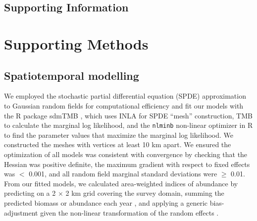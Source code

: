 \documentclass[12pt]{article}
\begin{document}

\renewcommand{\thefigure}{S\arabic{figure}}
\renewcommand{\thetable}{S\arabic{table}}
\setcounter{figure}{0}
\setcounter{table}{0}
\setcounter{section}{0}
\setcounter{subsection}{0}
\setcounter{subsubsection}{0}

\clearpage

\appendix


\setcounter{secnumdepth}{0} %

\onehalfspacing
\linenumbers
\resetlinenumber
\setcounter{page}{1}
\setcounter{equation}{0}
\nolinenumbers

\begin{Center}
\section*{Supporting Information}
\end{Center}

\section*{Supporting Methods}

\subsection*{Spatiotemporal modelling}

We employed the stochastic partial differential equation (SPDE) approximation to Gaussian random fields for computational efficiency and fit our models with the R package sdmTMB \citep{anderson2022}, which uses INLA \citep{lindgren2015} for SPDE ``mesh'' construction, TMB \citep{kristensen2016} to calculate the marginal log likelihood, and the \texttt{nlminb} non-linear optimizer in R \citep{r2023} to find the parameter values that maximize the marginal log likelihood.
We constructed the meshes with vertices at least 10 km apart.
We ensured the optimization of all models was consistent with convergence by checking that the Hessian was positive definite, the maximum gradient with respect to fixed effects was $<$ 0.001, and all random field marginal standard deviations were $\ge$ 0.01.
From our fitted models, we calculated area-weighted indices of abundance by predicting on a 2 $\times$ 2 km grid covering the survey domain, summing the predicted biomass or abundance each year \citep{thorson2015a}, and applying a generic bias-adjustment given the non-linear transformation of the random effects \citep{thorson2016bias}.
\end{document}
